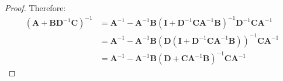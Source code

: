 \begin{proof}
	Therefore:
	\begin{equation}
		\begin{aligned}
		\left(\mathbf{A}+\mathbf{B}\mathbf{D}^{-1}\mathbf{C}\right)^{-1}&=\mathbf{A}^{-1}-\mathbf{A}^{-1}\mathbf{B}\left(\mathbf{I}+\mathbf{D}^{-1}\mathbf{C}\mathbf{A}^{-1}\mathbf{B}\right)^{-1}\mathbf{D}^{-1}\mathbf{C}\mathbf{A}^{-1}\\
		&=\mathbf{A}^{-1}-\mathbf{A}^{-1}\mathbf{B}\left(\mathbf{D}(\mathbf{I}+\mathbf{D}^{-1}\mathbf{C}\mathbf{A}^{-1}\mathbf{B})\right)^{-1}\mathbf{C}\mathbf{A}^{-1}\\
		&=\mathbf{A}^{-1}-\mathbf{A}^{-1}\mathbf{B}\left(\mathbf{D}+\mathbf{C}\mathbf{A}^{-1}\mathbf{B}\right)^{-1}\mathbf{C}\mathbf{A}^{-1}
		\end{aligned}
	\end{equation}
\end{proof}
